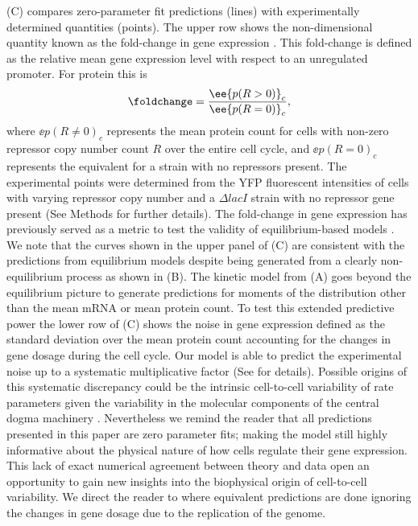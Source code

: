(C) compares zero-parameter fit predictions (lines) with
experimentally determined quantities (points). The upper row shows the
non-dimensional quantity known as the fold-change in gene expression
\cite{Garcia2011c}. This fold-change is defined as the relative mean gene
expression level with respect to an unregulated promoter. For protein this is
\begin{equation}
	\foldchange = {\ee{p(R > 0)}_c \over \ee{p(R = 0)}_c},
\end{equation}
where $\ee{p(R \neq 0)}_c$ represents the mean protein count for cells with
non-zero repressor copy number count $R$ over the entire cell cycle, and
$\ee{p(R = 0)}_c$ represents the equivalent for a strain with no repressors
present. The experimental points were determined from the YFP fluorescent
intensities of cells with varying repressor copy number and a $\Delta lacI$
strain with no repressor gene present (See Methods for further details). The
fold-change in gene expression has previously served as a metric to test the
validity of equilibrium-based models \cite{Phillips2015}. We note that the
curves shown in the upper panel of (C) are consistent
with the predictions from equilibrium models \cite{Razo-Mejia2018} despite
being generated from a clearly non-equilibrium process as shown in
(B). The kinetic model from (A)
goes beyond the equilibrium picture to generate predictions for moments of the
distribution other than the mean mRNA or mean protein count. To test this
extended predictive power the lower row of (C) shows the
noise in gene expression defined as the standard deviation over the mean
protein count accounting for the changes in gene dosage during the cell cycle.
Our model is able to predict the experimental noise up to a systematic
multiplicative factor (See  for details). Possible
origins of this systematic discrepancy could be the intrinsic cell-to-cell
variability of rate parameters given the variability in the molecular
components of the central dogma machinery \cite{Jones2014a}. Nevertheless we
remind the reader that all predictions presented in this paper are zero
parameter fits; making the model still highly informative about the physical
nature of how cells regulate their gene expression. This lack of exact
numerical agreement between theory and data open an opportunity to gain new
insights into the biophysical origin of cell-to-cell variability.
We direct the reader to  where equivalent predictions
are done ignoring the changes in gene dosage due to the replication of the genome.


